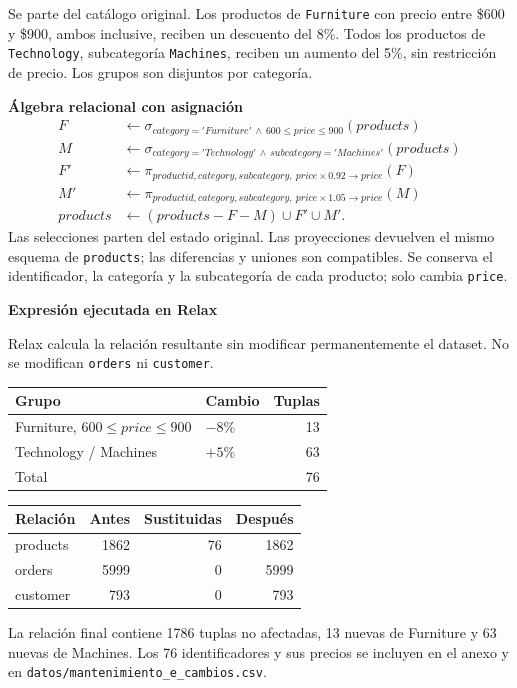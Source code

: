 Se parte del catálogo original. Los productos de \texttt{Furniture} con precio entre \$600 y \$900, ambos inclusive, reciben un descuento del 8\%. Todos los productos de \texttt{Technology}, subcategoría \texttt{Machines}, reciben un aumento del 5\%, sin restricción de precio. Los grupos son disjuntos por categoría.

\textbf{Álgebra relacional con asignación}
\begin{align*}
F &\leftarrow \sigma_{category='Furniture'\,\land\,600\leq price\leq900}(products)\\
M &\leftarrow \sigma_{category='Technology'\,\land\,subcategory='Machines'}(products)\\
F' &\leftarrow \pi_{productid,category,subcategory,\ price\times0.92\to price}(F)\\
M' &\leftarrow \pi_{productid,category,subcategory,\ price\times1.05\to price}(M)\\
products &\leftarrow (products-F-M)\cup F'\cup M'.
\end{align*}
Las selecciones parten del estado original. Las proyecciones devuelven el mismo esquema de \texttt{products}; las diferencias y uniones son compatibles. Se conserva el identificador, la categoría y la subcategoría de cada producto; solo cambia \texttt{price}.

\textbf{Expresión ejecutada en Relax}

Relax calcula la relación resultante sin modificar permanentemente el dataset. No se modifican \texttt{orders} ni \texttt{customer}.
\begin{center}\begin{tabular}{llr}\toprule\rowcolor{Fondo}
Grupo & Cambio & Tuplas\\\midrule
Furniture, $600\leq price\leq900$ & $-8\%$ & 13\\
Technology / Machines & $+5\%$ & 63\\\midrule
Total & & 76\\\bottomrule
\end{tabular}\end{center}
\begin{center}\begin{tabular}{lrrr}\toprule\rowcolor{Fondo}
Relación & Antes & Sustituidas & Después\\\midrule
products & 1862 & 76 & 1862\\
orders & 5999 & 0 & 5999\\
customer & 793 & 0 & 793\\\bottomrule
\end{tabular}\end{center}
La relación final contiene 1786 tuplas no afectadas, 13 nuevas de Furniture y 63 nuevas de Machines. Los 76 identificadores y sus precios se incluyen en el anexo y en \texttt{datos/mantenimiento\_e\_cambios.csv}.

